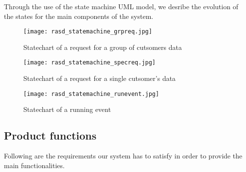 \documentclass[../main.tex]{subfiles}
\begin{document}
Through the use of the state machine UML model, we desribe the evolution of the states for the main components of the system.

\begin{figure}[H]
	\texttt{[image: rasd\_statemachine\_grpreq.jpg]}
	\caption{Statechart of a request for a group of cutsomers data}
	\label{fig:statemachine_grpreq}
\end{figure}

\begin{figure}[H]
	\texttt{[image: rasd\_statemachine\_specreq.jpg]}
	\caption{Statechart of a request for a single cutsomer's data}
	\label{fig:statemachine_specreq}
\end{figure}

\begin{figure}[H]
	\texttt{[image: rasd\_statemachine\_runevent.jpg]}
	\caption{Statechart of a running event}
	\label{fig:statemachine_runevent}
\end{figure}

\subsection{Product functions}

Following are the requirements our system has to satisfy in order to provide the main functionalities.
\end{document}

